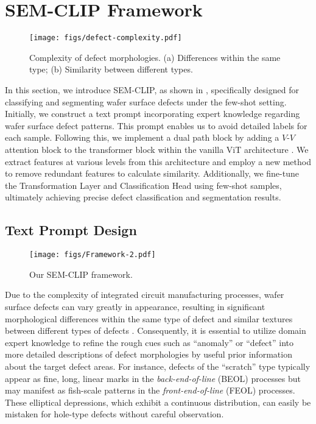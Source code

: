 \section{SEM-CLIP Framework}
\label{sec:framework}

\begin{figure}[h]
  \centering
  \texttt{[image: figs/defect-complexity.pdf]}
  \caption{Complexity of defect morphologies. (a) Differences within the same type; (b) Similarity between different types. }
  \label{fig:defect-complexity}
\end{figure}

In this section, we introduce SEM-CLIP, as shown in , specifically designed for classifying and segmenting wafer surface defects under the few-shot setting. Initially, we construct a text prompt incorporating expert knowledge regarding wafer surface defect patterns. This prompt enables us to avoid detailed labels for each sample. Following this, we implement a dual path block by adding a $V$-$V$ attention block to the transformer block within the vanilla ViT architecture \cite{dosovitskiy2020image}. 
We extract features at various levels from this architecture and employ a new method to remove redundant features to calculate similarity. Additionally, we fine-tune the Transformation Layer and Classification Head using few-shot samples, ultimately achieving precise defect classification and segmentation results.

\subsection{Text Prompt Design}
\begin{figure*}[tb!]
  \centering
  \texttt{[image: figs/Framework-2.pdf]}
  \caption{Our SEM-CLIP framework. }
  \label{fig:SEM-CLIP}
\end{figure*}

Due to the complexity of integrated circuit manufacturing processes, wafer surface defects can vary greatly in appearance, resulting in significant morphological differences within the same type of defect and similar textures between different types of defects . Consequently, it is essential to utilize domain expert knowledge to refine the rough cues such as ``anomaly'' or ``defect'' into more detailed descriptions of defect morphologies by useful prior information about the target defect areas. 
For instance, defects of the ``scratch'' type typically appear as fine, long, linear marks in the \textit{back-end-of-line} (BEOL) processes but may manifest as fish-scale patterns in the \textit{front-end-of-line} (FEOL) processes. 
These elliptical depressions, which exhibit a continuous distribution, can easily be mistaken for hole-type defects without careful observation.

